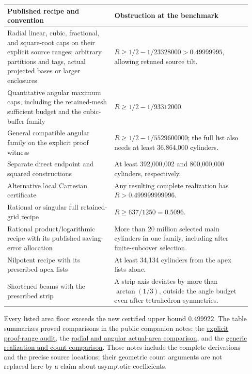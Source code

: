 \documentclass[11pt]{amsart}
\theoremstyle{definition}
\theoremstyle{remark}
\newcommand{\repo}[2]{\href{https://github.com/shjvandekamp/math/blob/main/topics/cylinder-covering/#1}{#2}}
\begin{document}
\begin{center}
\small
\renewcommand{\arraystretch}{1.18}
\begin{tabular}{@{}>{\raggedright\arraybackslash}p{}>{\raggedright\arraybackslash}p{}@{}}
\toprule
Published recipe and convention & Obstruction at the benchmark\\
\midrule
Radial linear, cubic, fractional, and square-root caps on their explicit
source ranges; arbitrary partitions and tags, actual projected bases or
larger enclosures
& $R\ge1/2-1/23328000>0.49999995$, allowing retuned source tilt.\\
Quantitative angular maximum caps, including the retained-mesh sufficient
budget and the cubic-buffer family
& $R\ge1/2-1/93312000$.\\
General compatible angular family on the explicit proof witness
& $R\ge1/2-1/5529600000$; the full list also needs at least 36,864,000 cylinders.\\
Separate direct endpoint and squared constructions
& At least 392,000,002 and 800,000,000 cylinders, respectively.\\
Alternative local Cartesian certificate
& Any resulting complete realization has $R>0.499999999996$.\\
Rational or singular full retained-grid recipe
& $R\ge637/1250=0.5096$.\\
Rational product/logarithmic recipe with its published saving-error
allocation
& More than 20 million selected main cylinders in one family, including
after finite-subcover selection.\\
Nilpotent recipe with its prescribed apex lists
& At least 34,134 cylinders from the apex lists alone.\\
Shortened beams with the prescribed strip
& A strip axis deviates by more than $\arctan(1/3)$, outside the angle
budget even after tetrahedron symmetries.\\
\bottomrule
\end{tabular}
\end{center}
Every listed area floor exceeds the new certified upper bound
$0.499922$. The table summarizes proved comparisons in the public
companion notes: the
\repo{research/published-proof-ranges.md}{explicit proof-range audit},
the \repo{research/published-radial-angular-comparison.md}{radial and
angular actual-area comparison}, and the
\repo{verification/published-generic-comparison.md}{generic realization
and count comparison}. Those notes include the complete derivations and
the precise source locations; their geometric count arguments are not
replaced here by a claim about asymptotic coefficients.
\end{document}
